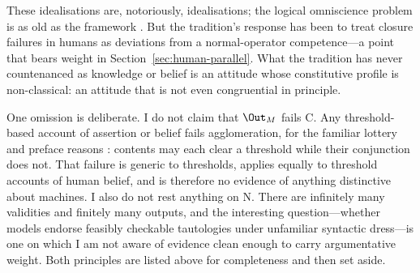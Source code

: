 These idealisations are, notoriously, idealisations; the logical omniscience
problem is as old as the framework \citep{fagin1995}. But the tradition's
response has been to treat closure failures in humans as deviations from a
normal-operator competence---a point that bears weight in
Section~\ref{sec:human-parallel}. What the tradition has never countenanced as
knowledge or belief is an attitude whose constitutive profile is non-classical:
an attitude that is not even congruential in principle.

One omission is deliberate. I do not claim that $\Out_M$ fails C. Any
threshold-based account of assertion or belief fails agglomeration, for the
familiar lottery and preface reasons \citep{makinson1965}: contents may each
clear a threshold while their conjunction does not. That failure is generic to
thresholds, applies equally to threshold accounts of human belief, and is
therefore no evidence of anything distinctive about machines. I also do not rest
anything on N. There are infinitely many validities and finitely many outputs,
and the interesting question---whether models endorse feasibly checkable
tautologies under unfamiliar syntactic dress---is one on which I am not aware of
evidence clean enough to carry argumentative weight. Both principles are listed
above for completeness and then set aside.
